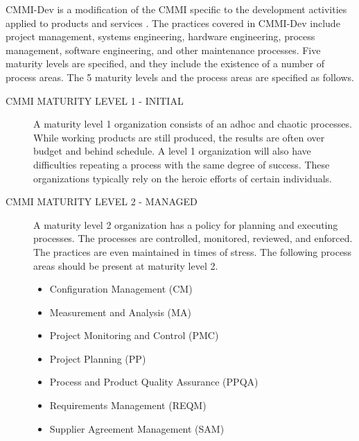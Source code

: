 \documentclass[SDSUThesis.tex]{subfiles}
\begin{document}
    CMMI-Dev is a modification of the CMMI specific to the 
    development activities applied to products
    and services \cite{CMMI}.  The practices covered in 
    CMMI-Dev include project management, 
    systems engineering, hardware engineering, process 
    management, software engineering, and 
    other maintenance processes.  Five maturity levels are 
    specified, and they include the 
    existence of a number of process areas.  The 5 maturity 
    levels and the process areas are specified as follows.

    \begin{description}
        \item[CMMI MATURITY LEVEL 1 - INITIAL]
            A maturity level 1 organization consists of an
                adhoc and chaotic processes.  While working
                products are still produced, the results are 
                often over budget and behind schedule.  A level
                1 organization will also have difficulties 
                repeating a process with the same degree of 
                success.  These organizations typically rely 
                on the heroic efforts of certain individuals. 
            
        \item[CMMI MATURITY LEVEL 2 - MANAGED]
            A maturity level 2 organization has a policy for 
            planning and executing processes.  
            The processes are controlled, monitored, 
            reviewed, and enforced.  The practices are even
            maintained in times of stress.  The following 
            process areas should be present at maturity
            level 2.
            \begin{itemize}
                \item Configuration Management (CM)
                \item Measurement and Analysis (MA)
                \item Project Monitoring and Control (PMC)
                \item Project Planning (PP)
                \item Process and Product Quality Assurance (PPQA)
                \item Requirements Management (REQM)
                \item Supplier Agreement Management (SAM)
            \end{itemize}


\end{description}
\end{document}
